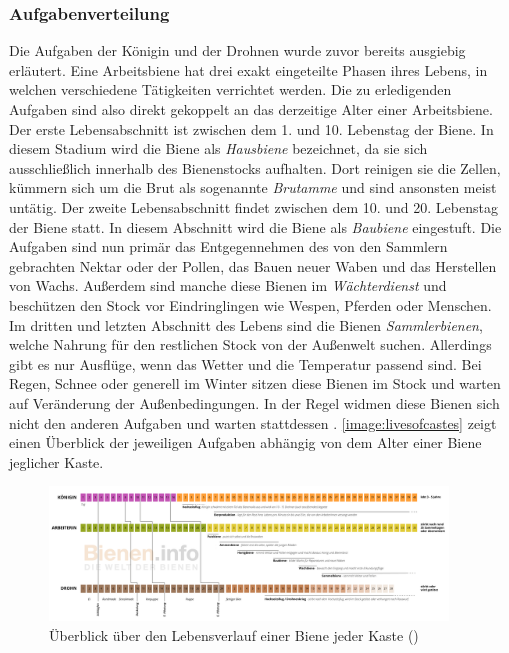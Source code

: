 \subsubsection{Aufgabenverteilung}
Die Aufgaben der Königin und der Drohnen wurde zuvor bereits ausgiebig erläutert.
Eine Arbeitsbiene hat drei exakt eingeteilte Phasen ihres Lebens, in welchen verschiedene Tätigkeiten verrichtet werden. Die zu erledigenden Aufgaben sind also direkt gekoppelt an das derzeitige Alter einer Arbeitsbiene. Der erste Lebensabschnitt ist zwischen dem 1. und 10. Lebenstag der Biene. In diesem Stadium wird die Biene als \textit{Hausbiene} bezeichnet, da sie sich 
ausschließlich innerhalb des Bienenstocks aufhalten. Dort reinigen sie die Zellen, kümmern sich um die Brut als sogenannte \textit{Brutamme} und sind ansonsten meist untätig. Der zweite Lebensabschnitt findet zwischen dem 10. und 20. Lebenstag der Biene statt. In diesem Abschnitt wird die Biene als \textit{Baubiene} eingestuft. Die Aufgaben sind nun primär das Entgegennehmen des von den Sammlern gebrachten Nektar oder der Pollen, das Bauen neuer Waben und das Herstellen von Wachs. Außerdem sind manche diese Bienen im \textit{Wächterdienst} und beschützen den Stock vor Eindringlingen wie Wespen, Pferden oder Menschen. Im dritten und letzten Abschnitt des Lebens sind die Bienen \textit{Sammlerbienen}, welche Nahrung für den restlichen Stock von der Außenwelt suchen. Allerdings gibt es nur Ausflüge, wenn das Wetter und die Temperatur passend sind. Bei Regen, Schnee oder generell im Winter sitzen diese Bienen im Stock und warten auf Veränderung der Außenbedingungen. In der Regel widmen diese Bienen sich nicht den anderen Aufgaben und warten stattdessen \cite*[S.42-44]{bees:frisch}. \autoref{image:livesofcastes} zeigt einen Überblick der jeweiligen Aufgaben abhängig von dem Alter einer Biene jeglicher Kaste.

\begin{figure}
    \begin{center}
        \includegraphics[width=400px]{0.bilder/livesofcastes.png}
    \end{center}
    \caption{Überblick über den Lebensverlauf einer Biene jeder Kaste (\cite[]{bees:lifeexpectancy})} \label{image:livesofcastes}
\end{figure}

